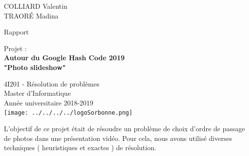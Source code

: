 \documentclass[12pt,a4paper]{article}
\begin{document}
	\begin{flushleft}
	COLLIARD Valentin\\
    \vspace{1\baselineskip}
    TRAORÉ Madina\\
    \end{flushleft}
    \begin{center}
    \vspace{12\baselineskip}
    \begin{huge}
    Rapport\\
    \end{huge}
    \vspace{1\baselineskip}
    \begin{Large}
    Projet :\\
    \textbf{Autour du Google Hash Code 2019\\
    "Photo slideshow"}\\
    \end{Large}
    \vspace{1\baselineskip}
    4I201 - Résolution de problèmes\\
    \vspace{15\baselineskip}
    Master d'Informatique
    \vspace{1\baselineskip}
    \\Ann\'ee universitaire 2018-2019\\
    \vspace{2\baselineskip}
    \texttt{[image: ../../../../logoSorbonne.png]}
    \end{center}
    \newpage
    \renewcommand{\contentsname}{\begin{LARGE}
    Sommaire
    \end{LARGE}}
    \noindent\hrulefill
    \vspace{1\baselineskip}
    \begin{large}
    {\setlength{\baselineskip}{1.5\baselineskip}
\tableofcontents\par}
    \end{large}
    \vspace{2\baselineskip}
    \noindent\hrulefill
    
    \newpage


\noindent L'objectif de ce projet était de résoudre un problème de choix d'ordre de passage
de photos dans une présentation vidéo. Pour cela, nous
avons utilisé diverses techniques
( heuristiques et exactes ) de résolution.
\end{document}
